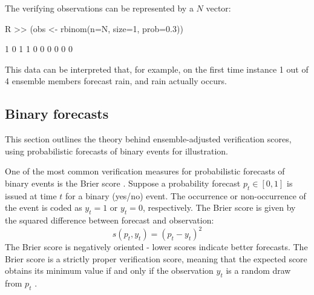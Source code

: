 \documentclass[article]{jss}
\begin{document}
The verifying observations can be represented by a $N$ vector:

\begin{Schunk}
\begin{Sinput}
R >> (obs <- rbinom(n=N, size=1, prob=0.3))
\end{Sinput}
\begin{Soutput}
 [1] 1 0 1 1 0 0 0 0 0 0
\end{Soutput}
\end{Schunk}

This data can be interpreted that, for example, on the first time instance 1 out of 4 ensemble members forecast rain, and rain actually occurs.





\subsection{Binary forecasts}

This section outlines the theory behind ensemble-adjusted verification scores, using probabilistic forecasts of binary events for illustration.  

One of the most common verification measures for probabilistic forecasts of binary events is the Brier score \citep{brier1950verification}.
Suppose a probability forecast $p_t \in [0,1]$ is issued at time $t$ for a binary (yes/no) event.
The occurrence or non-occurrence of the event is coded as $y_t=1$ or $y_t=0$, respectively. 
The Brier score is given by the squared difference between forecast and observation:
%
\begin{equation}
s(p_t, y_t) = (p_t - y_t)^2
\end{equation}
%
The Brier score is negatively oriented - lower scores indicate better forecasts.
The Brier score is a strictly proper verification score, meaning that the expected score obtains its minimum value if and only if the observation $y_t$ is a random draw from $p_t$ \citep{gneiting2007strictly}.
\end{document}
